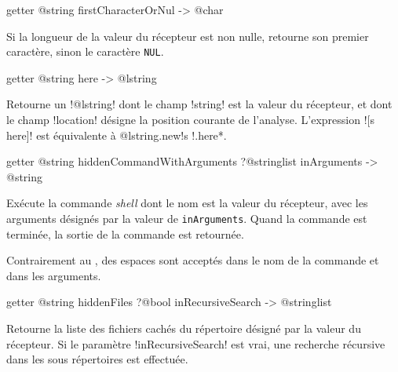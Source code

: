 
\begin{galgas3box}
getter @string firstCharacterOrNul -> @char
\end{galgas3box}

Si la longueur de la valeur du récepteur est non nulle, retourne son premier caractère, sinon le caractère \texttt{NUL}.








\begin{galgas3box}
getter @string here -> @lstring
\end{galgas3box}

Retourne un \ggst!@lstring! dont le champ \ggst!string! est la valeur du récepteur, et dont le champ \ggst!location! désigne la position courante de l'analyse. L'expression \ggst![s here]! est équivalente à \ggst*@lstring.new{!s !.here}*.













\begin{galgas3box}
getter @string hiddenCommandWithArguments ?@stringlist inArguments -> @string
\end{galgas3box}
Exécute la commande \emph{shell} dont le nom est la valeur du récepteur, avec les arguments désignés par la valeur de \texttt{inArguments}. Quand la commande est terminée, la sortie de la commande est retournée.

Contrairement au , des espaces sont acceptés dans le nom de la commande et dans les arguments.









\begin{galgas3box}
getter @string hiddenFiles ?@bool inRecursiveSearch -> @stringlist
\end{galgas3box}

Retourne la liste des fichiers cachés du répertoire désigné par la valeur du récepteur. Si le paramètre \ggst!inRecursiveSearch! est vrai, une recherche récursive dans les sous répertoires est effectuée.










